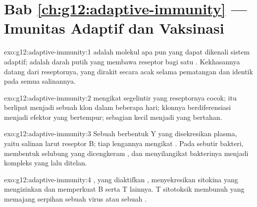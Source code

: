 \section*{Bab \ref{ch:g12:adaptive-immunity} --- Imunitas Adaptif dan Vaksinasi}

\begin{solution}{exo:g12:adaptive-immunity:1}
 adalah molekul apa pun yang dapat dikenali sistem adaptif;
 adalah  darah putih yang membawa reseptor bagi satu
. Kekhasannya datang dari reseptornya, yang dirakit secara acak
selama pematangan dan identik pada semua salinannya.
\end{solution}

\begin{solution}{exo:g12:adaptive-immunity:2}
 mengikat segelintir  yang reseptornya cocok;  itu
berlipat menjadi sebuah klon dalam beberapa hari; klonnya
berdiferensiasi menjadi  efektor yang bertempur; sebagian kecil
menjadi  yang bertahan.
\end{solution}

\begin{solution}{exo:g12:adaptive-immunity:3}
Sebuah  berbentuk Y yang disekresikan  plasma, yaitu salinan
larut reseptor  B; tiap lengannya mengikat . Pada sebutir
bakteri,  membentuk selubung yang dicengkeram , dan
menyilangikat bakterinya menjadi kompleks yang lalu ditelan.
\end{solution}

\begin{solution}{exo:g12:adaptive-immunity:4}
, yang diaktifkan , menyekresikan sitokina
yang mengizinkan dan memperkuat  B serta  T lainnya.  T
sitotoksik membunuh  yang memajang serpihan sebuah virus atau
 sebuah .
\end{solution}

